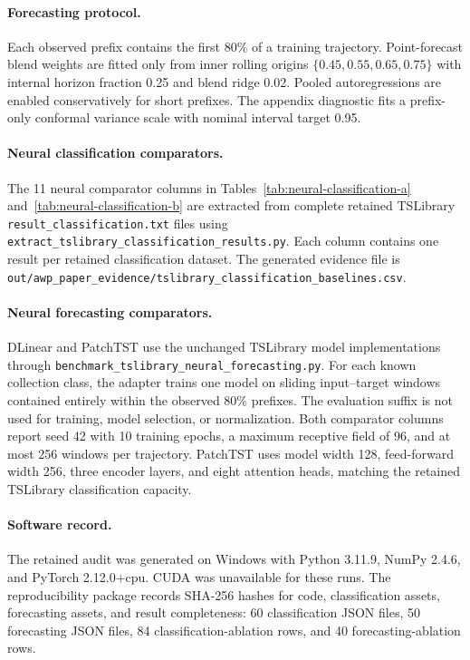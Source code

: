 \documentclass[11pt]{article}
\begin{document}
\paragraph{Forecasting protocol.}
Each observed prefix contains the first 80\% of a training trajectory. Point-forecast blend weights are fitted only from inner rolling origins $\{0.45,0.55,0.65,0.75\}$ with internal horizon fraction 0.25 and blend ridge 0.02. Pooled autoregressions are enabled conservatively for short prefixes. The appendix diagnostic fits a prefix-only conformal variance scale with nominal interval target 0.95.

\paragraph{Neural classification comparators.}
The 11 neural comparator columns in Tables~\ref{tab:neural-classification-a} and~\ref{tab:neural-classification-b} are extracted from complete retained TSLibrary \texttt{result\_classification.txt} files using \texttt{extract\_tslibrary\_classification\_results.py}. Each column contains one result per retained classification dataset. The generated evidence file is \texttt{out/awp\_paper\_evidence/tslibrary\_classification\_baselines.csv}.

\paragraph{Neural forecasting comparators.}
DLinear and PatchTST use the unchanged TSLibrary model implementations through \texttt{benchmark\_tslibrary\_neural\_forecasting.py}. For each known collection class, the adapter trains one model on sliding input--target windows contained entirely within the observed 80\% prefixes. The evaluation suffix is not used for training, model selection, or normalization. Both comparator columns report seed 42 with 10 training epochs, a maximum receptive field of 96, and at most 256 windows per trajectory. PatchTST uses model width 128, feed-forward width 256, three encoder layers, and eight attention heads, matching the retained TSLibrary classification capacity.

\paragraph{Software record.}
The retained audit was generated on Windows with Python 3.11.9, NumPy 2.4.6, and PyTorch 2.12.0+cpu. CUDA was unavailable for these runs. The reproducibility package records SHA-256 hashes for code, classification assets, forecasting assets, and result completeness: 60 classification JSON files, 50 forecasting JSON files, 84 classification-ablation rows, and 40 forecasting-ablation rows.
\end{document}
